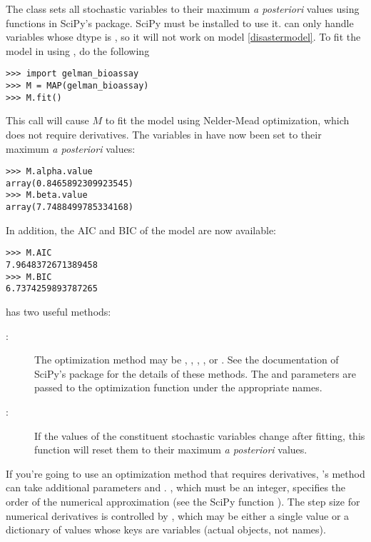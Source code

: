 The  class sets all stochastic variables to their maximum \emph{a posteriori} values using functions in SciPy's  package. SciPy must be installed to use it.  can only handle variables whose dtype is , so it will not work on model \ref{disastermodel}. To fit the model in  using , do the following  
\begin{verbatim}
>>> import gelman_bioassay
>>> M = MAP(gelman_bioassay)    
>>> M.fit()
\end{verbatim}
This call will cause $M$ to fit the model using Nelder-Mead optimization, which does not require derivatives. The variables in  have now been set to their maximum \emph{a posteriori} values:
\begin{verbatim}
>>> M.alpha.value
array(0.8465892309923545)
>>> M.beta.value
array(7.7488499785334168)
\end{verbatim}
In addition, the AIC and BIC of the model are now available:
\begin{verbatim}
>>> M.AIC  
7.9648372671389458
>>> M.BIC
6.7374259893787265
\end{verbatim}

\bigskip
{} has two useful methods:
\begin{description}
    \item[:] The optimization method may be , , , , or . See the documentation of SciPy's  package for the details of these methods. The  and  parameters are passed to the optimization function under the appropriate names.
    \item[:] If the values of the constituent stochastic variables change after fitting, this function will reset them to their maximum \emph{a posteriori} values.
\end{description}
If you're going to use an optimization method that requires derivatives, 's  method can take additional parameters  and . , which must be an integer, specifies the order of the numerical approximation (see the SciPy function ). The step size for numerical derivatives is controlled by , which may be either a single value or a dictionary of values whose keys are variables (actual objects, not names).

